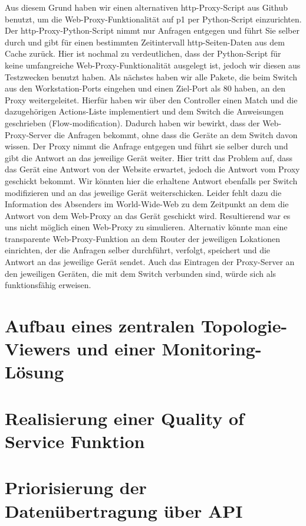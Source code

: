 \documentclass[fontsize=12pt,paper=a4,open=any,parskip=half,
  twoside=false,toc=listof,toc=bibliography,fleqn,leqno,
  captions=nooneline,captions=tableabove,british]{scrbook}
\begin{document}
Aus diesem Grund haben wir einen alternativen http-Proxy-Script aus Github benutzt, um die Web-Proxy-Funktionalität auf p1 per Python-Script einzurichten. Der http-Proxy-Python-Script nimmt nur Anfragen entgegen und führt Sie selber durch und gibt für einen bestimmten Zeitintervall http-Seiten-Daten aus dem Cache zurück. Hier ist nochmal zu verdeutlichen, dass der Python-Script für keine umfangreiche Web-Proxy-Funktionalität ausgelegt ist, jedoch wir diesen aus Testzwecken benutzt haben. Als nächstes haben wir alle Pakete, die beim Switch aus den Workstation-Ports eingehen und einen Ziel-Port als 80 haben, an den Proxy weitergeleitet. Hierfür haben wir über den Controller einen Match und die dazugehörigen Actions-Liste implementiert und dem Switch die Anweisungen geschrieben (Flow-modification). Dadurch haben wir bewirkt, dass der Web-Proxy-Server die Anfragen bekommt, ohne dass die Geräte an dem Switch davon wissen. Der Proxy nimmt die Anfrage entgegen und führt sie selber durch und gibt die Antwort an das jeweilige Gerät weiter. Hier tritt das Problem auf, dass das Gerät eine Antwort von der Website erwartet, jedoch die Antwort vom Proxy geschickt bekommt. Wir könnten hier die erhaltene Antwort ebenfalls per Switch modifizieren und an das jeweilige Gerät weiterschicken. Leider fehlt dazu die Information des Absenders im World-Wide-Web zu dem Zeitpunkt an dem die Antwort von dem Web-Proxy an das Gerät geschickt wird. Resultierend war es uns nicht möglich einen Web-Proxy zu simulieren. 
Alternativ könnte man eine transparente Web-Proxy-Funktion an dem Router der jeweiligen Lokationen einrichten, der die Anfragen selber durchführt, verfolgt, speichert und die Antwort an das jeweilige Gerät sendet. Auch das Eintragen der Proxy-Server an den jeweiligen Geräten, die mit dem Switch verbunden sind, würde sich als funktionsfähig erweisen. 

\section{Aufbau eines zentralen Topologie-Viewers und einer Monitoring-Lösung}

\section{Realisierung einer Quality of Service Funktion}

\section{Priorisierung der Datenübertragung über API}
\end{document}

